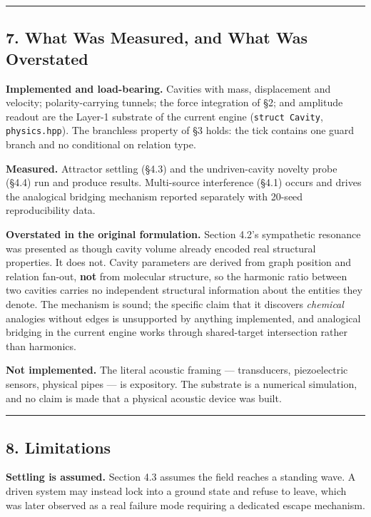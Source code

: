 \documentclass[
  11pt,
  a4paper,
]{article}
\begin{document}
\begin{center}\rule{0.5\linewidth}{0.5pt}\end{center}

\subsection{7. What Was Measured, and What Was
Overstated}\label{what-was-measured-and-what-was-overstated}

\textbf{Implemented and load-bearing.} Cavities with mass, displacement
and velocity; polarity-carrying tunnels; the force integration of §2;
and amplitude readout are the Layer-1 substrate of the current engine
(\texttt{struct\ Cavity}, \texttt{physics.hpp}). The branchless property
of §3 holds: the tick contains one guard branch and no conditional on
relation type.

\textbf{Measured.} Attractor settling (§4.3) and the undriven-cavity
novelty probe (§4.4) run and produce results. Multi-source interference
(§4.1) occurs and drives the analogical bridging mechanism reported
separately with 20-seed reproducibility data.

\textbf{Overstated in the original formulation.} Section 4.2's
sympathetic resonance was presented as though cavity volume already
encoded real structural properties. It does not. Cavity parameters are
derived from graph position and relation fan-out, \textbf{not} from
molecular structure, so the harmonic ratio between two cavities carries
no independent structural information about the entities they denote.
The mechanism is sound; the specific claim that it discovers
\emph{chemical} analogies without edges is unsupported by anything
implemented, and analogical bridging in the current engine works through
shared-target intersection rather than harmonics.

\textbf{Not implemented.} The literal acoustic framing --- transducers,
piezoelectric sensors, physical pipes --- is expository. The substrate
is a numerical simulation, and no claim is made that a physical acoustic
device was built.

\begin{center}\rule{0.5\linewidth}{0.5pt}\end{center}

\subsection{8. Limitations}\label{limitations}

\textbf{Settling is assumed.} Section 4.3 assumes the field reaches a
standing wave. A driven system may instead lock into a ground state and
refuse to leave, which was later observed as a real failure mode
requiring a dedicated escape mechanism.
\end{document}

